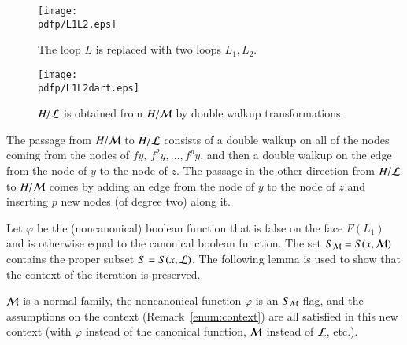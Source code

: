 \begin{figure}[htb]
  \centering
  \texttt{[image: \\pdfp/L1L2.eps]}
  \caption{The loop $L$ is replaced with two loops $L_1, L_2$.}
  \label{fig:L1L2}
\end{figure}

\begin{figure}[htb]
  \centering
  \texttt{[image: \\pdfp/L1L2dart.eps]}
  \caption{$H/{\cal L}$ is obtained from $H/{\cal M}$ by double walkup transformations.}
  \label{fig:L1L2dart}
\end{figure}

The passage from  $H/{\cal M}$ to $H/{\cal L}$ consists of  a double walkup on all of the nodes coming from the nodes of $f y$, $f^2 y, \ldots, f^p y$, and then a double walkup on the edge from the node of $y$ to the node of $z$.  The passage in the other direction from $H/{\cal L}$ to $H/{\cal M}$ comes by adding an edge from the node of $y$ to the node of $z$ and inserting $p$ new nodes (of degree two) along it.


Let $\varphi$ be the (noncanonical) boolean function that is false on the face $F(L_1)$ and is otherwise equal to the canonical boolean function. The set $S_{\cal M}=S(x,{\cal M})$ contains the proper subset $S=S(x,{\cal L})$.  The following lemma is used to show that the context of the iteration is preserved.

\begin{lemma}  
${\cal M}$ is a normal family, the noncanonical function $\varphi$ is an $S_{\cal M}$-flag, and the assumptions on the context (Remark~\ref{enum:context}) are all satisfied in this new context (with $\varphi$ instead of the canonical function, ${\cal M}$ instead of ${\cal L}$, etc.).
\end{lemma}


